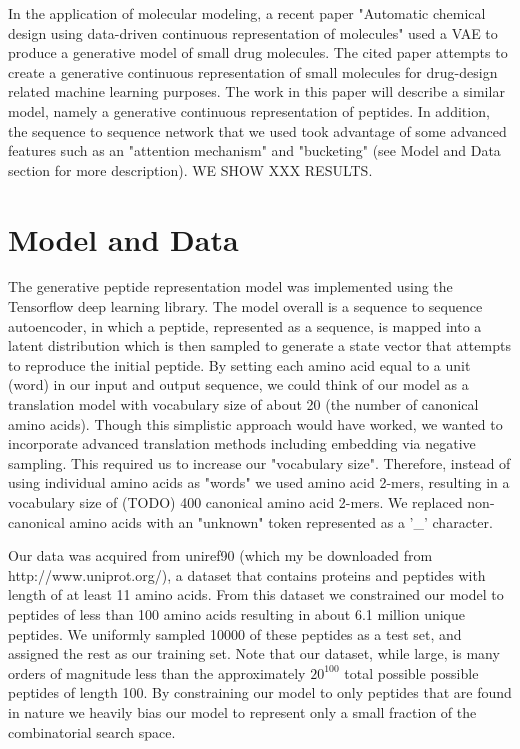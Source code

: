 \documentclass[preprint,12pt]{elsarticle}
\begin{document}
In the application of molecular modeling, a recent paper "Automatic chemical design using data-driven continuous representation of molecules"\cite{gomez2016automatic} used a VAE to produce a generative model of small drug molecules. The cited paper attempts to create a generative continuous representation of small molecules for drug-design related machine learning purposes. The work in this paper will describe a similar model, namely a generative continuous representation of peptides. In addition, the sequence to sequence network that we used took advantage of some advanced features such as an "attention mechanism" and "bucketing" (see Model and Data section for more description). WE SHOW XXX RESULTS.

\section{Model and Data}

The generative peptide representation model was implemented using the Tensorflow deep learning library\cite{tensorflow2015-whitepaper}. The model overall is a sequence to sequence autoencoder, in which a peptide, represented as a sequence, is mapped into a latent distribution which is then sampled to generate a state vector that attempts to reproduce the initial peptide. By setting each amino acid equal to a unit (word) in our input and output sequence, we could think of our model as a translation model with vocabulary size of about 20 (the number of canonical amino acids). Though this simplistic approach would have worked, we wanted to incorporate advanced translation methods including embedding via negative sampling. This required us to increase our "vocabulary size". Therefore, instead of using individual amino acids as "words" we used amino acid 2-mers, resulting in a vocabulary size of (TODO) 400 canonical amino acid 2-mers. We replaced non-canonical amino acids with an "unknown" token represented as a '\_' character.

Our data was acquired from uniref90 (which my be downloaded from http://www.uniprot.org/), a dataset that contains proteins and peptides with length of at least 11 amino acids. From this dataset we constrained our model to peptides of less than 100 amino acids resulting in about 6.1 million unique peptides. We uniformly sampled 10000 of these peptides as a test set, and assigned the rest as our training set. Note that our dataset, while large, is many orders of magnitude less than the approximately $20^{100}$ total possible possible peptides of length 100. By constraining our model to only peptides that are found in nature we heavily bias our model to represent only a small fraction of the combinatorial search space.
\end{document}
